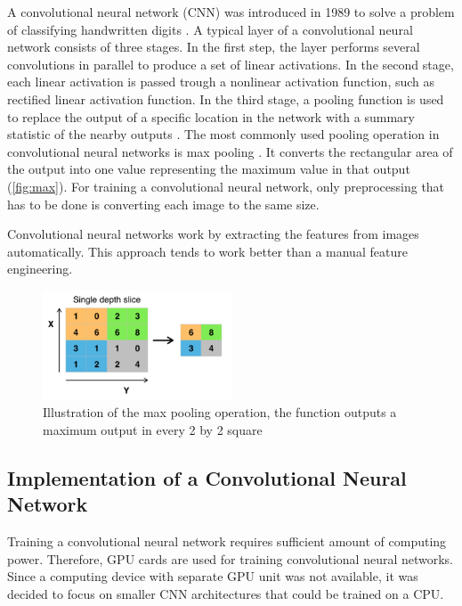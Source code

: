A convolutional neural network (CNN) was introduced in 1989 to solve a problem of classifying handwritten digits \cite{lecun}.
A typical layer of a convolutional neural network consists of three stages. In the first step, the layer performs several convolutions in parallel to produce a set of linear activations. In the second stage, each linear activation is passed trough a nonlinear activation function, such as rectified linear activation function. In the third stage, a pooling function is used to replace the output of a specific location in the network with a summary statistic of the nearby outputs \cite{Goodfellow-et-al-2017}. The most commonly used pooling operation in convolutional neural networks is max pooling \cite{max}. It converts the rectangular area of the output into one value representing the maximum value in that output (\autoref{fig:max}). For training a convolutional neural network, only preprocessing that has to be done is converting each image to the same size.

Convolutional neural networks work by extracting the features from images automatically. This approach tends to work better than a manual feature engineering.

\begin{figure}[h]
\centering
\includegraphics[width=0.5\textwidth]{Figures/4/Max_pooling.png}
\caption{Illustration of the max pooling operation, the function outputs a maximum output in every 2 by 2 square \citep{wiki:Convolutional}}
\label{fig:max}
\end{figure}
 

\subsection{Implementation of a Convolutional Neural Network}

Training a convolutional neural network requires sufficient amount of computing power. Therefore,  GPU cards are used for training convolutional neural networks. Since a computing device with separate GPU unit was not available, it was decided to focus on smaller CNN architectures that could be trained on a CPU.

